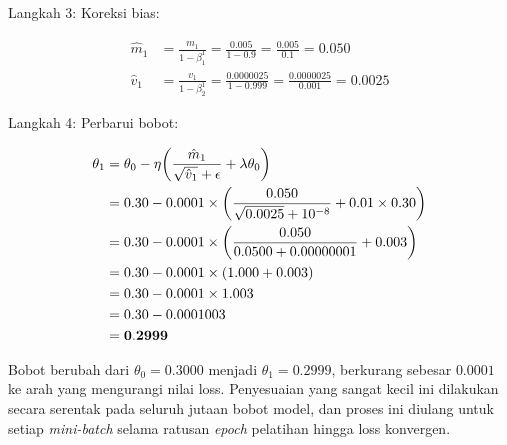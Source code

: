  
\noindent Langkah 3: Koreksi bias:
 
\vspace{0.5cm}
\begin{align*}
  \hat{m}_1
  &= \frac{m_1}{1 - \beta_1^1}
   = \frac{0.005}{1 - 0.9}
   = \frac{0.005}{0.1}
   = \mathbf{0.050} \\[4pt]
  \hat{v}_1
  &= \frac{v_1}{1 - \beta_2^1}
   = \frac{0.0000025}{1 - 0.999}
   = \frac{0.0000025}{0.001}
   = \mathbf{0.0025}
\end{align*}
\vspace{0.5cm}
 
\noindent Langkah 4: Perbarui bobot:
 
\vspace{0.5cm}
\begin{align*}
  \theta_1
  &= \theta_0 - \eta\!\left(
       \frac{\hat{m}_1}{\sqrt{\hat{v}_1} + \epsilon}
       + \lambda \theta_0
     \right) \notag \\
  &= 0.30 - 0.0001 \times \left(
       \frac{0.050}{\sqrt{0.0025} + 10^{-8}}
       + 0.01 \times 0.30
     \right) \notag \\
  &= 0.30 - 0.0001 \times \left(
       \frac{0.050}{0.0500 + 0.00000001}
       + 0.003
     \right) \notag \\
  &= 0.30 - 0.0001 \times (1.000 + 0.003) \notag \\
  &= 0.30 - 0.0001 \times 1.003 \notag \\
  &= 0.30 - 0.0001003 \notag \\
  &= \mathbf{0.2999}
\end{align*}
\vspace{0.5cm}
 
\noindent
Bobot berubah dari $\theta_0 = 0.3000$ menjadi $\theta_1 = 0.2999$,
berkurang sebesar $0.0001$ ke arah yang mengurangi nilai loss.
Penyesuaian yang sangat kecil ini dilakukan secara serentak pada
seluruh jutaan bobot model, dan proses ini diulang untuk setiap
\textit{mini-batch} selama ratusan \textit{epoch} pelatihan hingga
loss konvergen.
